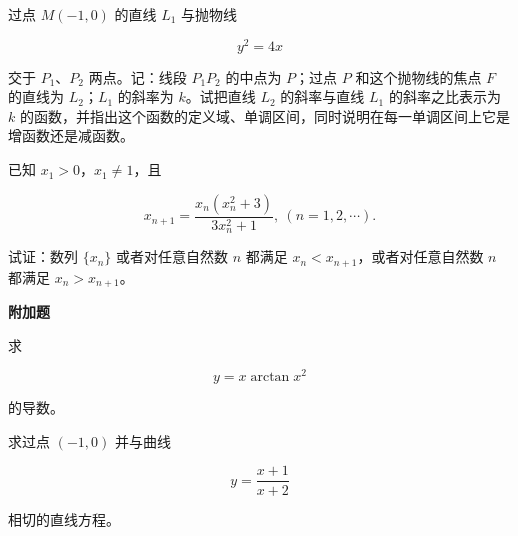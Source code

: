 \begin{question}
过点 $M(-1,0)$ 的直线 $L_1$ 与抛物线

\nopagebreak[4]
\[
y^2=4x
\]

交于 $P_1\text{、}P_2$ 两点。记：线段 $P_1P_2$ 的中点为 $P$；过点 $P$ 和这个抛物线的焦点 $F$ 的直线为 $L_2$；$L_1$ 的斜率为 $k$。试把直线 $L_2$ 的斜率与直线 $L_1$ 的斜率之比表示为 $k$ 的函数，并指出这个函数的定义域、单调区间，同时说明在每一单调区间上它是增函数还是减函数。

\end{question}
\begin{question}
已知 $x_1>0$，$x_1\ne1$，且

\nopagebreak[4]
\[
x_{n+1}=\frac{x_n(x_n^2+3)}{3x_n^2+1},\ (n=1,2,\cdots).
\]

试证：数列 $\{x_n\}$ 或者对任意自然数 $n$ 都满足 $x_n<x_{n+1}$，或者对任意自然数 $n$ 都满足 $x_n>x_{n+1}$。

\Needspace{0.25\textheight}
\textbf{附加题}

\end{question}
\begin{question}
求

\nopagebreak[4]
\[
y=x\arctan x^2
\]

的导数。

\end{question}
\begin{question}
求过点 $(-1,0)$ 并与曲线

\nopagebreak[4]
\[
y=\frac{x+1}{x+2}
\]

相切的直线方程。

\end{question}